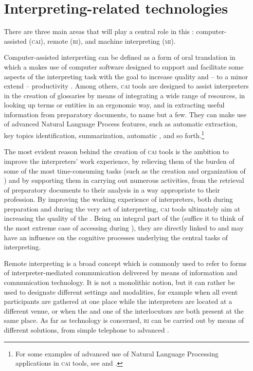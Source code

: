 \documentclass[output=paper]{langsci/langscibook}
\begin{document}
\section{Interpreting-related technologies} 
There are three main areas that will play a central role in this : computer-assisted (\textsc{cai}), remote (\textsc{ri}), and machine interpreting (\textsc{mi}). 
 
Computer-assisted interpreting can be defined as a form of oral translation in which a  makes use of computer software designed to support and facilitate some aspects of the interpreting task with the goal to increase quality and -- to a minor extend -- productivity \citep{Fantinuoli2018}. Among others, \textsc{cai} tools are designed to assist interpreters in the creation of glossaries by means of integrating a wide range of  resources, in looking up terms or entities in an ergonomic way, and in extracting useful information from preparatory documents, to name but a few. They can make use of advanced Natural Language Process features, such as automatic  extraction, key topics identification, summarization, automatic , and so forth.\footnote{For some examples of advanced use of Natural Language Processing applications in \textsc{cai} tools, see 
\citet{Fantinuoli2017b}
and \citet{stewart_automatic_2018}.} 
 
The most evident reason behind the creation of \textsc{cai} tools is the ambition to improve the interpreters’ work experience, by relieving them of the burden of some of the most time-consuming tasks (such as the creation and organization of ) and by supporting them in carrying out numerous activities, from the retrieval of preparatory documents to their analysis in a way appropriate to their profession. By improving the working experience of interpreters, both during preparation and during the very act of interpreting, \textsc{cai} tools ultimately aim at increasing the quality of the . Being an integral part of the  (suffice it to think of the most extreme case of accessing  during ), they are directly linked to and may have an influence on the cognitive processes underlying the central tasks of interpreting.   
 
Remote interpreting is a broad concept which is commonly used to refer to forms of interpreter-mediated communication delivered by means of information and communication technology. It is not a monolithic notion, but it can rather be used to designate different settings and modalities, for example when all event participants are gathered at one place while the interpreters are located at a different venue, or when the  and one of the interlocutors are both present at the same place. As far as technology is concerned, \textsc{ri} can be carried out by means of different solutions, from simple telephone to advanced  . 
 
\end{document}

